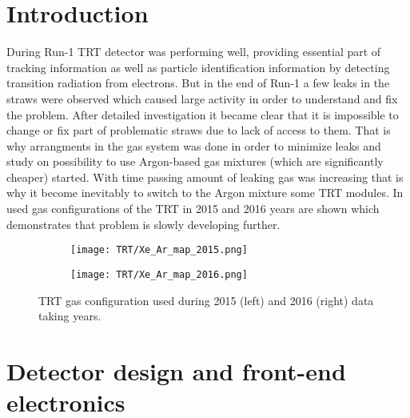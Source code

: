 \section{Introduction}
\label{sec:TRT_intro}

During Run-1 TRT detector was performing well, providing essential part of tracking information as well as particle identification
information by detecting transition radiation from electrons. But in the end of Run-1 a few leaks in the straws were
observed which caused large activity in order to understand and fix the problem. After detailed investigation it became
clear that it is impossible to change or fix part of problematic straws due to lack of access to them. That is why 
arrangments in the gas system was done in order to minimize leaks and study on possibility to use Argon-based 
gas mixtures (which are significantly cheaper) started. With time passing amount of leaking gas was increasing that is
why it become inevitably to switch to the Argon mixture some TRT modules. In  used gas 
configurations of the TRT in 2015 and 2016 years are shown which demonstrates that problem is slowly developing
further.

\begin{figure}
\centering
\begin{subfigure}{.5\textwidth}
  \centering
  \texttt{[image: TRT/Xe\_Ar\_map\_2015.png]}
  \label{fig:sub1}
\end{subfigure}%
\begin{subfigure}{.5\textwidth}
  \centering
  \texttt{[image: TRT/Xe\_Ar\_map\_2016.png]}
  \label{fig:sub2}
\end{subfigure}
\caption{TRT gas configuration used during 2015 (left) and 2016 (right) data taking years.}
\label{fig:mixed_condition_2015_2016}
\end{figure}


\section{Detector design and front-end electronics}
\label{sec:trt_straw_hw}

